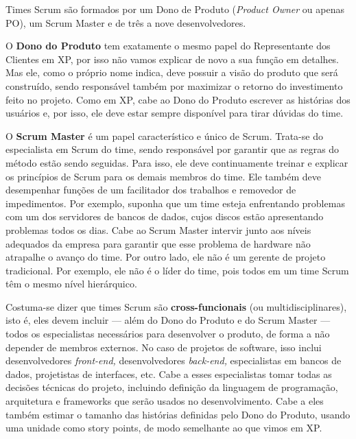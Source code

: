 \documentclass[
  11pt,
  twoside]{book}
\begin{document}
 Times Scrum são formados por um Dono de Produto
(\emph{Product Owner} ou apenas PO), um Scrum Master e de três a nove
desenvolvedores.

 
 

O \textbf{Dono do Produto} tem exatamente o mesmo papel do Representante
dos Clientes em XP, por isso não vamos explicar de novo a sua função em
detalhes. Mas ele, como o próprio nome indica, deve possuir a visão do
produto que será construído, sendo responsável também por maximizar o
retorno do investimento feito no projeto. Como em XP, cabe ao Dono do
Produto escrever as histórias dos usuários e, por isso, ele deve estar
sempre disponível para tirar dúvidas do time.

  O \textbf{Scrum Master}
é um papel característico e único de Scrum. Trata-se do especialista em
Scrum do time, sendo responsável por garantir que as regras do método
estão sendo seguidas. Para isso, ele deve continuamente treinar e
explicar os princípios de Scrum para os demais membros do time. Ele
também deve desempenhar funções de um facilitador dos trabalhos e
removedor de impedimentos. Por exemplo, suponha que um time esteja
enfrentando problemas com um dos servidores de bancos de dados, cujos
discos estão apresentando problemas todos os dias. Cabe ao Scrum Master
intervir junto aos níveis adequados da empresa para garantir que esse
problema de hardware não atrapalhe o avanço do time. Por outro lado, ele
não é um gerente de projeto tradicional. Por exemplo, ele não é o líder
do time, pois todos em um time Scrum têm o mesmo nível hierárquico.

Costuma-se dizer que times Scrum são \textbf{cross-funcionais} (ou
multidisciplinares), isto é, eles devem incluir --- além do Dono do
Produto e do Scrum Master --- todos os especialistas necessários para
desenvolver o produto, de forma a não depender de membros externos. No
caso de projetos de software, isso inclui desenvolvedores
\emph{front-end,} desenvolvedores \emph{back-end,} especialistas em
bancos de dados, projetistas de interfaces, etc. Cabe a esses
especialistas tomar todas as decisões técnicas do projeto, incluindo
definição da linguagem de programação, arquitetura e frameworks que
serão usados no desenvolvimento. Cabe a eles também estimar o tamanho
das histórias definidas pelo Dono do Produto, usando uma unidade como
story points, de modo semelhante ao que vimos em XP.
\end{document}
